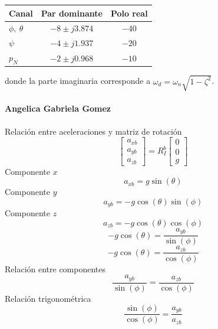 \documentclass[11pt,a4paper]{article}
\begin{document}
\begin{center}
\begin{tabular}{lcc}
\toprule
Canal & Par dominante & Polo real \\
\midrule
$\phi,\ \theta$ & $-8 \pm j3.874$ & $-40$ \\
$\psi$          & $-4 \pm j1.937$ & $-20$ \\
$p_N$           & $-2 \pm j0.968$ & $-10$ \\
\bottomrule
\end{tabular}
\end{center}

\noindent
donde la parte imaginaria corresponde a
$\omega_d=\omega_n\sqrt{1-\zeta^{2}}$.


\paragraph{Angelica Gabriela Gomez}
Relación entre aceleraciones y matriz de rotación
\begin{equation}
\begin{bmatrix}
a_{xb} \\
a_{yb} \\
a_{zb}
\end{bmatrix}
=
R_I^b
\begin{bmatrix}
0 \\
0 \\
g
\end{bmatrix}
\end{equation}
 Componente $x$
\begin{equation}
a_{xb} = g\sin(\theta)
\end{equation}
Componente $y$
\begin{equation}
a_{yb} = -g\cos(\theta)\sin(\phi)
\end{equation}
Componente $z$
\begin{equation}
a_{zb} = -g\cos(\theta)\cos(\phi)
\end{equation}
\begin{equation}
-g\cos(\theta)
=
\frac{a_{yb}}{\sin(\phi)}
\end{equation}
\begin{equation}
-g\cos(\theta)
=
\frac{a_{zb}}{\cos(\phi)}
\end{equation}
Relación entre componentes
\begin{equation}
\frac{a_{yb}}{\sin(\phi)}
=
\frac{a_{zb}}{\cos(\phi)}
\end{equation}
Relación trigonométrica
\begin{equation}
\frac{\sin(\phi)}{\cos(\phi)}
=
\frac{a_{yb}}{a_{zb}}
\end{equation}
\end{document}
